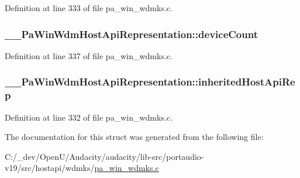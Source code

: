 Definition at line 333 of file pa\+\_\+win\+\_\+wdmks.\+c.

\subsubsection[{\texorpdfstring{device\+Count}{deviceCount}}]{ \+\_\+\+\_\+\+Pa\+Win\+Wdm\+Host\+Api\+Representation\+::device\+Count}\hypertarget{struct_____pa_win_wdm_host_api_representation_a698d7764ee087e177079cca725c08686}{}\label{struct_____pa_win_wdm_host_api_representation_a698d7764ee087e177079cca725c08686}


Definition at line 337 of file pa\+\_\+win\+\_\+wdmks.\+c.

\subsubsection[{\texorpdfstring{inherited\+Host\+Api\+Rep}{inheritedHostApiRep}}]{ \+\_\+\+\_\+\+Pa\+Win\+Wdm\+Host\+Api\+Representation\+::inherited\+Host\+Api\+Rep}\hypertarget{struct_____pa_win_wdm_host_api_representation_a73b6839eeeedfad62406b6929c26d3ad}{}\label{struct_____pa_win_wdm_host_api_representation_a73b6839eeeedfad62406b6929c26d3ad}


Definition at line 332 of file pa\+\_\+win\+\_\+wdmks.\+c.



The documentation for this struct was generated from the following file\+:\begin{DoxyCompactItemize}
\item 
C\+:/\+\_\+dev/\+Open\+U/\+Audacity/audacity/lib-\/src/portaudio-\/v19/src/hostapi/wdmks/\hyperlink{pa__win__wdmks_8c}{pa\+\_\+win\+\_\+wdmks.\+c}\end{DoxyCompactItemize}
